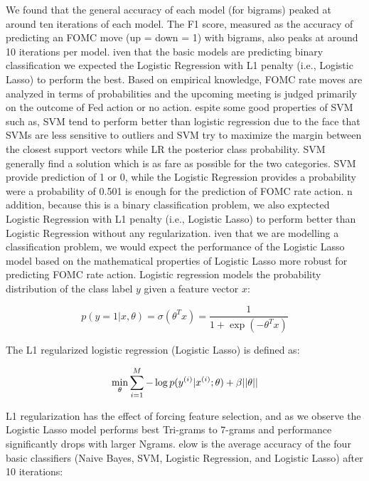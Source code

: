 \documentclass[11pt]{article}
\newcommand{\vertSpace}[1]{\vspace{3mm}}
\begin{document}
We found that the general accuracy of each model (for bigrams) peaked at around ten iterations of each model.  The F1 score, measured as the accuracy of predicting an FOMC move (up = down = 1) with bigrams, also peaks at around 10 iterations per model. \vertSpace


Given that the basic models are predicting binary classification we expected the Logistic Regression with L1 penalty (i.e., Logistic Lasso) to perform the best.  Based on empirical knowledge, FOMC rate moves are analyzed in terms of probabilities and the upcoming meeting is judged primarily on the outcome of Fed action or no action.  \vertSpace


Despite some good properties of SVM such as, SVM tend to perform better than logistic regression due to the face that SVMs are less sensitive to outliers and SVM try to maximize the margin between the closest support vectors while LR the posterior class probability. SVM generally find a solution which is as fare as possible for the two categories.  SVM provide prediction of 1 or 0, while the Logistic Regression provides a probability were a probability of 0.501 is enough for the prediction of FOMC rate action.  \vertSpace


In addition, because this is a binary classification problem, we also exptected Logistic Regression with L1 penalty (i.e., Logistic Lasso) to perform better than Logistic Regression without any regularization.  \vertSpace 

Given that we are modelling a classification problem, we would expect the performance of the Logistic Lasso model based on the mathematical properties of Logistic Lasso more robust for predicting FOMC rate action.  Logistic regression models the probability distribution of the class label $y$ given a feature vector $x$: 

$$p(y=1|x,\theta) = \sigma(\theta^T x) = \frac{1}{1+\exp(-\theta^Tx)}$$

The L1 regularized logistic regression (Logistic Lasso) is defined as: 

$$\underset{\rm \theta}{\rm min} \sum_{i=1}^M -\log p(y^{(i)}|x^{(i)}; \theta) + \beta ||\theta||$$

L1 regularization has the effect of forcing feature selection, and as we observe the Logistic Lasso model performs best Tri-grams to 7-grams and performance significantly drops with larger Ngrams.  \vertSpace 


Below is the average accuracy of the four basic classifiers (Naive Bayes, SVM, Logistic Regression, and Logistic Lasso) after 10 iterations: 
\end{document}
